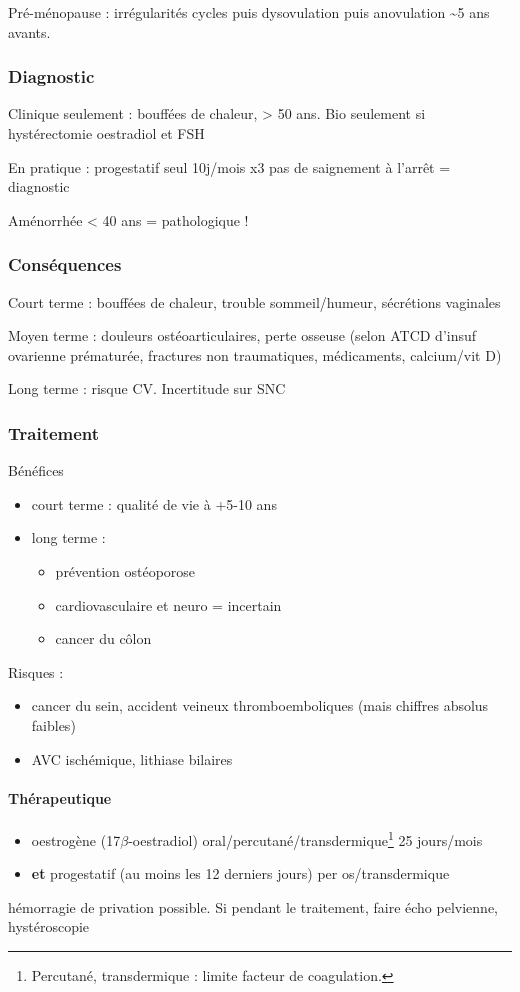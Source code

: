 \documentclass[11pt]{article}
\begin{document}
Pré-ménopause : irrégularités cycles puis dysovulation puis anovulation \textasciitilde{}5 ans
avants.

\subsubsection{Diagnostic}
\label{sec:org378d0be}
Clinique seulement \danger : bouffées de chaleur, \female > 50 ans. Bio
seulement si hystérectomie \thus \dec oestradiol et \inc FSH

En pratique : progestatif seul 10j/mois x3 \thus pas de saignement à l'arrêt =
diagnostic

Aménorrhée < 40 ans = pathologique !

\subsubsection{Conséquences}
\label{sec:orgd383fc7}
Court terme : bouffées de chaleur, trouble sommeil/humeur, \dec sécrétions
vaginales

Moyen terme : douleurs ostéoarticulaires, \inc perte osseuse (selon ATCD d'insuf
ovarienne prématurée, fractures non traumatiques, médicaments, calcium/vit D)

Long terme : \inc risque CV. Incertitude sur SNC

\subsubsection{Traitement}
\label{sec:org176454b}
Bénéfices
\begin{itemize}
\item court terme : qualité de vie à +5-10 ans
\item long terme :
\begin{itemize}
\item prévention ostéoporose
\item cardiovasculaire et neuro = incertain
\item cancer du côlon
\end{itemize}
\end{itemize}
Risques :
\begin{itemize}
\item \inc cancer du sein, accident veineux thromboemboliques (mais chiffres absolus
faibles)
\item \inc AVC ischémique, lithiase bilaires
\end{itemize}

\paragraph{Thérapeutique}
\label{sec:orgfd6bb76}
\begin{itemize}
\item oestrogène (17\(\beta\)-oestradiol) oral/percutané/transdermique\footnote{Percutané, transdermique : limite \inc facteur de coagulation.} 25 jours/mois
\item \textbf{et} progestatif (au moins les 12 derniers jours) per os/transdermique
\end{itemize}
\danger hémorragie de privation possible. Si pendant le traitement, faire écho
pelvienne, hystéroscopie
\end{document}
